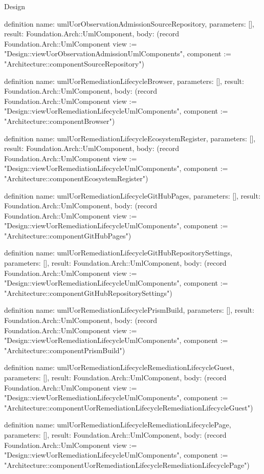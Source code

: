 \begin{lexlean}{Design}
\begin{semanticmodule}
definition{
  name: umlUorObservationAdmissionSourceRepository,
  parameters: [],
  result: Foundation.Arch::UmlComponent,
  body: (record Foundation.Arch::UmlComponent {view := "Design::viewUorObservationAdmissionUmlComponents", component := "Architecture::componentSourceRepository"})
}

definition{
  name: umlUorRemediationLifecycleBrowser,
  parameters: [],
  result: Foundation.Arch::UmlComponent,
  body: (record Foundation.Arch::UmlComponent {view := "Design::viewUorRemediationLifecycleUmlComponents", component := "Architecture::componentBrowser"})
}

definition{
  name: umlUorRemediationLifecycleEcosystemRegister,
  parameters: [],
  result: Foundation.Arch::UmlComponent,
  body: (record Foundation.Arch::UmlComponent {view := "Design::viewUorRemediationLifecycleUmlComponents", component := "Architecture::componentEcosystemRegister"})
}

definition{
  name: umlUorRemediationLifecycleGitHubPages,
  parameters: [],
  result: Foundation.Arch::UmlComponent,
  body: (record Foundation.Arch::UmlComponent {view := "Design::viewUorRemediationLifecycleUmlComponents", component := "Architecture::componentGitHubPages"})
}

definition{
  name: umlUorRemediationLifecycleGitHubRepositorySettings,
  parameters: [],
  result: Foundation.Arch::UmlComponent,
  body: (record Foundation.Arch::UmlComponent {view := "Design::viewUorRemediationLifecycleUmlComponents", component := "Architecture::componentGitHubRepositorySettings"})
}

definition{
  name: umlUorRemediationLifecyclePrismBuild,
  parameters: [],
  result: Foundation.Arch::UmlComponent,
  body: (record Foundation.Arch::UmlComponent {view := "Design::viewUorRemediationLifecycleUmlComponents", component := "Architecture::componentPrismBuild"})
}

definition{
  name: umlUorRemediationLifecycleRemediationLifecycleGuest,
  parameters: [],
  result: Foundation.Arch::UmlComponent,
  body: (record Foundation.Arch::UmlComponent {view := "Design::viewUorRemediationLifecycleUmlComponents", component := "Architecture::componentUorRemediationLifecycleRemediationLifecycleGuest"})
}

definition{
  name: umlUorRemediationLifecycleRemediationLifecyclePage,
  parameters: [],
  result: Foundation.Arch::UmlComponent,
  body: (record Foundation.Arch::UmlComponent {view := "Design::viewUorRemediationLifecycleUmlComponents", component := "Architecture::componentUorRemediationLifecycleRemediationLifecyclePage"})
}


\end{semanticmodule}
\end{lexlean}

